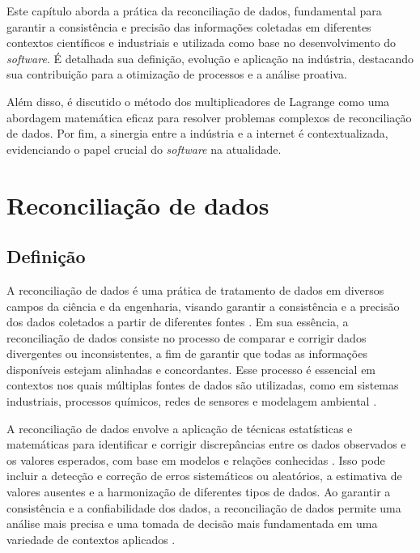 \label{Cap:ReferencialTeorico}

Este capítulo aborda a prática da reconciliação de dados, fundamental para garantir a consistência e precisão das informações coletadas em diferentes contextos científicos e industriais e utilizada como base no desenvolvimento do \textit{software}. É detalhada sua definição, evolução e aplicação na indústria, destacando sua contribuição para a otimização de processos e a análise proativa. 
    
Além disso, é discutido o método dos multiplicadores de Lagrange como uma abordagem matemática eficaz para resolver problemas complexos de reconciliação de dados. Por fim, a sinergia entre a indústria e a internet é contextualizada, evidenciando o papel crucial do \textit{software} na atualidade.

\section{Reconciliação de dados}
\subsection{Definição}

A reconciliação de dados é uma prática de tratamento de dados em diversos campos da ciência e da engenharia, visando garantir a consistência e a precisão dos dados coletados a partir de diferentes fontes \cite{datarecshakar}. Em sua essência, a reconciliação de dados consiste no processo de comparar e corrigir dados divergentes ou inconsistentes, a fim de garantir que todas as informações disponíveis estejam alinhadas e concordantes. Esse processo é essencial em contextos nos quais múltiplas fontes de dados são utilizadas, como em sistemas industriais, processos químicos, redes de sensores e modelagem ambiental \cite{datarecshakar}.
        
A reconciliação de dados envolve a aplicação de técnicas estatísticas e matemáticas para identificar e corrigir discrepâncias entre os dados observados e os valores esperados, com base em modelos e relações conhecidas \cite{datarecragnoli}. Isso pode incluir a detecção e correção de erros sistemáticos ou aleatórios, a estimativa de valores ausentes e a harmonização de diferentes tipos de dados. Ao garantir a consistência e a confiabilidade dos dados, a reconciliação de dados permite uma análise mais precisa e uma tomada de decisão mais fundamentada em uma variedade de contextos aplicados \cite{datarecragnoli}.
    

